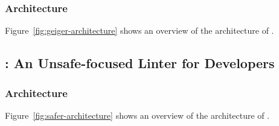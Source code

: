 \subsubsection{Architecture}



Figure~\ref{fig:geiger-architecture} shows an overview of the architecture of \toolUsage{}.


\subsection{\toolSA{}: An Unsafe-focused Linter for Developers}

\subsubsection{Architecture}

Figure~\ref{fig:safer-architecture} shows an overview of the architecture of \toolSA{}.

